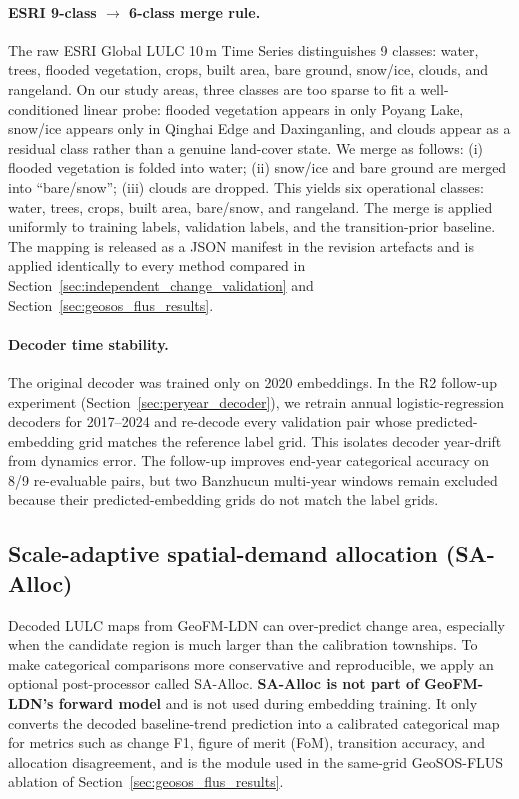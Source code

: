 \documentclass{article}
\begin{document}
\paragraph{ESRI 9-class $\to$ 6-class merge rule.} The raw ESRI Global LULC 10\,m Time Series distinguishes 9 classes: water, trees, flooded vegetation, crops, built area, bare ground, snow/ice, clouds, and rangeland. On our study areas, three classes are too sparse to fit a well-conditioned linear probe: flooded vegetation appears in only Poyang Lake, snow/ice appears only in Qinghai Edge and Daxinganling, and clouds appear as a residual class rather than a genuine land-cover state. We merge as follows: (i) flooded vegetation is folded into water; (ii) snow/ice and bare ground are merged into ``bare/snow''; (iii) clouds are dropped. This yields six operational classes: water, trees, crops, built area, bare/snow, and rangeland. The merge is applied uniformly to training labels, validation labels, and the transition-prior baseline. The mapping is released as a JSON manifest in the revision artefacts and is applied identically to every method compared in Section~\ref{sec:independent_change_validation} and Section~\ref{sec:geosos_flus_results}.

\paragraph{Decoder time stability.} The original decoder was trained only on 2020 embeddings. In the R2 follow-up experiment (Section~\ref{sec:peryear_decoder}), we retrain annual logistic-regression decoders for 2017--2024 and re-decode every validation pair whose predicted-embedding grid matches the reference label grid. This isolates decoder year-drift from dynamics error. The follow-up improves end-year categorical accuracy on 8/9 re-evaluable pairs, but two Banzhucun multi-year windows remain excluded because their predicted-embedding grids do not match the label grids.

\subsection{Scale-adaptive spatial-demand allocation (SA-Alloc)}
\label{sec:scale_adaptive_allocation}

Decoded LULC maps from GeoFM-LDN can over-predict change area, especially when the candidate region is much larger than the calibration townships. To make categorical comparisons more conservative and reproducible, we apply an optional post-processor called SA-Alloc. \textbf{SA-Alloc is not part of GeoFM-LDN's forward model} and is not used during embedding training. It only converts the decoded baseline-trend prediction into a calibrated categorical map for metrics such as change F1, figure of merit (FoM), transition accuracy, and allocation disagreement, and is the module used in the same-grid GeoSOS-FLUS ablation of Section~\ref{sec:geosos_flus_results}.
\end{document}
